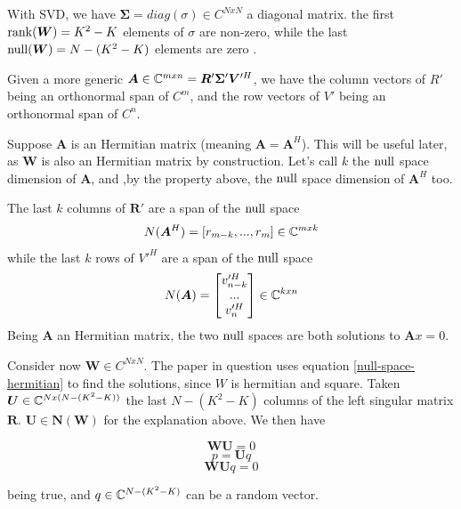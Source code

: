With SVD, we have $\bm{\Sigma} = diag(\sigma) \in C^{NxN}$ a diagonal matrix. the first $\operatorname{rank}(\bm{W}) = K^2-K$ elements of $\sigma$ are non-zero, while the last $\operatorname{null}(\bm{W}) = N - (K^2-K)$ elements are zero \cite{svd}.

Given a more generic $\bm{A} \in \mathbb{C}^{mxn} = \bm{R}'\bm{ \Sigma}' \bm{V}'^H$, we have the column vectors of $R'$ being an orthonormal span of $C^m$, and the row vectors of $V'$ being an orthonormal span of $C^n$.

Suppose $\bm{A}$ is an Hermitian matrix (meaning $\bm{A} = \bm{A}^H$). This will be useful later, as $\bm{W}$ is also an Hermitian matrix by construction. Let's call $k$ the $\operatorname{null}$ space dimension of $\bm{A}$, and ,by the property above, the $\operatorname{null}$ space dimension of $\bm{A}^H$ too.

The last $k$ columns of $\bm{R}'$ are a span of the $\operatorname{null}$ space
\begin{equation}
  N(\bm{A}^H) = [r_{m-k}, ..., r_m ] \in \mathbb{C}^{mxk}
  \label{null-space-hermitian}
\end{equation}
while the last $k$ rows of $V'^H$ are a span of the $\operatorname{null}$ space
\begin{equation}
  N(\bm{A}) = \begin{bmatrix} v'^H_{n-k} \\ ... \\ v'^H_n \end{bmatrix} \in \mathbb{C}^{kxn}
  \label{null-space-normal}
\end{equation}
Being $\bm{A}$ an Hermitian matrix, the two $\operatorname{null}$ spaces are both solutions to $\bm{A}x = 0$.

Consider now $\bm{W} \in C^{NxN}$. The paper in question uses equation \eqref{null-space-hermitian} to find the solutions, since $W$ is hermitian and square. Taken $\bm{U} \in \mathbb{C} ^ {Nx(N-(K^2 - K))}$ the last $N-(K^2 - K)$ columns of the left singular matrix $\bm{R}$. $\bm{U} \in \bm{N}(\bm{W})$ for the explanation above. We then have

\begin{equation}\bm{WU} = 0\end{equation}
\begin{equation}p = \bm{U}q\end{equation}
\begin{equation}
  \bm{WU}q = 0
  \label{q_random_vector}
\end{equation}

being true, and $q \in \mathbb{C}^{N-(K^2 - K)}$ can be a random vector.
